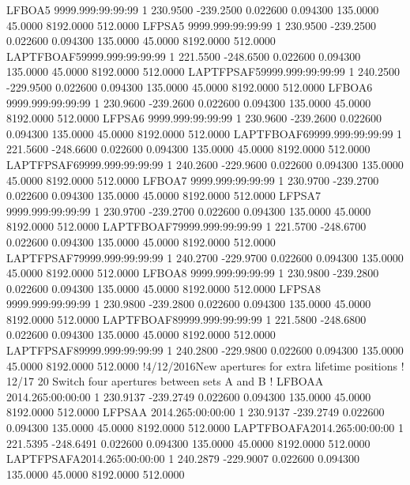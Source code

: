LFBOA5    9999.999:99:99:99  1    230.9500   -239.2500    0.022600    0.094300    135.0000     45.0000   8192.0000    512.0000
LFPSA5    9999.999:99:99:99  1    230.9500   -239.2500    0.022600    0.094300    135.0000     45.0000   8192.0000    512.0000
LAPTFBOAF59999.999:99:99:99  1    221.5500   -248.6500    0.022600    0.094300    135.0000     45.0000   8192.0000    512.0000
LAPTFPSAF59999.999:99:99:99  1    240.2500   -229.9500    0.022600    0.094300    135.0000     45.0000   8192.0000    512.0000
LFBOA6    9999.999:99:99:99  1    230.9600   -239.2600    0.022600    0.094300    135.0000     45.0000   8192.0000    512.0000
LFPSA6    9999.999:99:99:99  1    230.9600   -239.2600    0.022600    0.094300    135.0000     45.0000   8192.0000    512.0000
LAPTFBOAF69999.999:99:99:99  1    221.5600   -248.6600    0.022600    0.094300    135.0000     45.0000   8192.0000    512.0000
LAPTFPSAF69999.999:99:99:99  1    240.2600   -229.9600    0.022600    0.094300    135.0000     45.0000   8192.0000    512.0000
LFBOA7    9999.999:99:99:99  1    230.9700   -239.2700    0.022600    0.094300    135.0000     45.0000   8192.0000    512.0000
LFPSA7    9999.999:99:99:99  1    230.9700   -239.2700    0.022600    0.094300    135.0000     45.0000   8192.0000    512.0000
LAPTFBOAF79999.999:99:99:99  1    221.5700   -248.6700    0.022600    0.094300    135.0000     45.0000   8192.0000    512.0000
LAPTFPSAF79999.999:99:99:99  1    240.2700   -229.9700    0.022600    0.094300    135.0000     45.0000   8192.0000    512.0000
LFBOA8    9999.999:99:99:99  1    230.9800   -239.2800    0.022600    0.094300    135.0000     45.0000   8192.0000    512.0000
LFPSA8    9999.999:99:99:99  1    230.9800   -239.2800    0.022600    0.094300    135.0000     45.0000   8192.0000    512.0000
LAPTFBOAF89999.999:99:99:99  1    221.5800   -248.6800    0.022600    0.094300    135.0000     45.0000   8192.0000    512.0000
LAPTFPSAF89999.999:99:99:99  1    240.2800   -229.9800    0.022600    0.094300    135.0000     45.0000   8192.0000    512.0000
!4/12/2016New apertures for extra lifetime positions
! 12/17 20 Switch four apertures between sets A and B
!
LFBOAA    2014.265:00:00:00  1    230.9137   -239.2749    0.022600    0.094300    135.0000     45.0000   8192.0000    512.0000
LFPSAA    2014.265:00:00:00  1    230.9137   -239.2749    0.022600    0.094300    135.0000     45.0000   8192.0000    512.0000
LAPTFBOAFA2014.265:00:00:00  1    221.5395   -248.6491    0.022600    0.094300    135.0000     45.0000   8192.0000    512.0000
LAPTFPSAFA2014.265:00:00:00  1    240.2879   -229.9007    0.022600    0.094300    135.0000     45.0000   8192.0000    512.0000

